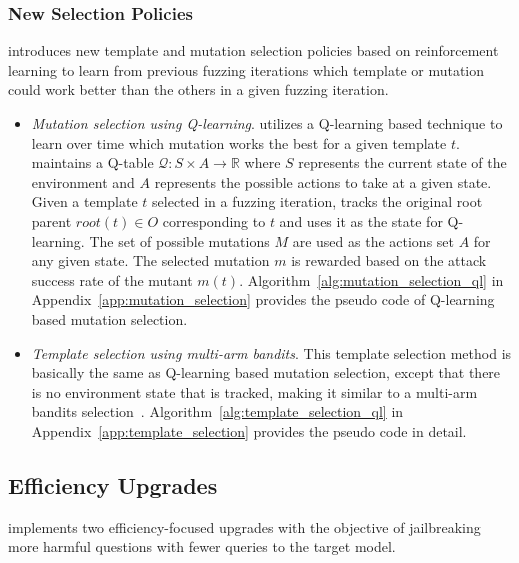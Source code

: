 \subsubsection{New Selection Policies}
\label{sec:selection}
\bedrockfuzz introduces new template and mutation selection policies based on reinforcement learning to learn from previous fuzzing iterations which template or mutation could work better than the others in a given fuzzing iteration.

\begin{itemize}
    \item \textit{Mutation selection using Q-learning}.
    \bedrockfuzz utilizes a Q-learning based technique to learn over time which mutation works the best for a given template $t$.
    \bedrockfuzz maintains a Q-table $\mathcal{Q} : \mathit{S} \times \mathit{A} \rightarrow \mathbb{R}$ where $\mathit{S}$ represents the current state of the environment and $\mathit{A}$ represents the possible actions to take at a given state.
    Given a template $t$ selected in a fuzzing iteration, \bedrockfuzz tracks the original root parent $root(t) \in O$ corresponding to $t$ and uses it as the state for Q-learning. The set of possible mutations $M$ are used as the actions set $\mathit{A}$ for any given state. The selected mutation $m$ is rewarded based on the attack success rate of the mutant $m(t)$. Algorithm~\ref{alg:mutation_selection_ql} in Appendix~\ref{app:mutation_selection} provides the pseudo code of Q-learning based mutation selection.
    
    \item \textit{Template selection using multi-arm bandits}. This template selection method is basically the same as Q-learning based mutation selection, except that there is no environment state that is tracked, making it similar to a multi-arm bandits selection~\cite{slivkins2019introduction}.
    Algorithm~\ref{alg:template_selection_ql} in Appendix~\ref{app:template_selection} provides the pseudo code in detail.
    \end{itemize}

\subsection{Efficiency Upgrades}
\label{sec:efficiency}
\bedrockfuzz implements two efficiency-focused upgrades with the objective of jailbreaking more harmful questions with fewer queries to the target model.


